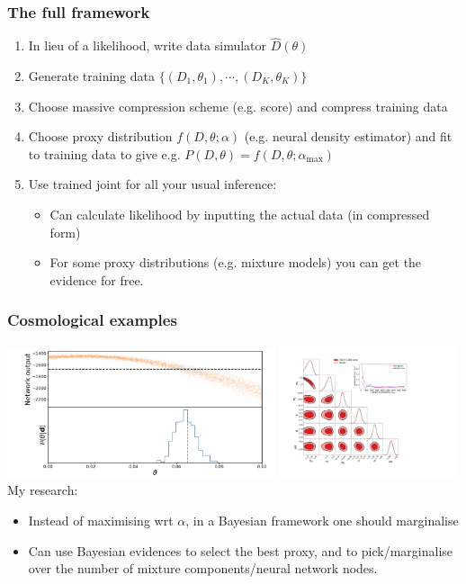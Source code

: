 \documentclass[%
    9pt,
]{beamer}
\begin{document}
\begin{frame}
    \frametitle{The full framework}
    \begin{enumerate}
        \item In lieu of a likelihood, write data simulator $\hat{D}(\theta)$
        \item Generate training data $\{(D_1,\theta_1),\cdots,(D_K,\theta_K)\}$
        \item Choose massive compression scheme (e.g. score) and compress training data
        \item Choose proxy distribution $f(D, \theta; \alpha)$ (e.g. neural density estimator) and fit to training data to give e.g. $P(D,\theta) = f(D, \theta; \alpha_\mathrm{max})$
        \item Use trained joint for all your usual inference:
            \begin{itemize}
                \item Can calculate likelihood by inputting the actual data (in compressed form)
                \item For some proxy distributions (e.g. mixture models) you can get the evidence for free.
            \end{itemize}
    \end{enumerate}
\end{frame}

\begin{frame}
    \frametitle{Cosmological examples}
    \includegraphics[width=0.59\textwidth]{./figures/tau.jpeg}
    \includegraphics[width=0.39\textwidth]{./figures/jla_contours_insert.pdf}
    My research:
    \begin{itemize}
        \item Instead of maximising wrt $\alpha$, in a Bayesian framework one should marginalise
        \item Can use Bayesian evidences to select the best proxy, and to pick/marginalise over the number of mixture components/neural network nodes.
    \end{itemize}
\end{frame}
\end{document}
